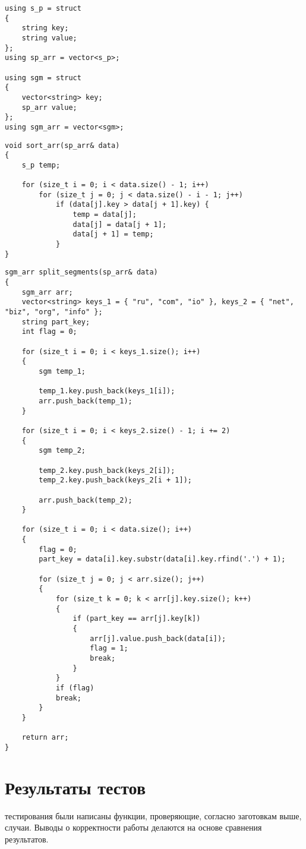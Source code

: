 \begin{lstlisting}[label=code4, caption = Используемые типы]
using s_p = struct
{
	string key;
	string value;
};
using sp_arr = vector<s_p>;

using sgm = struct
{
	vector<string> key;
	sp_arr value;
};
using sgm_arr = vector<sgm>;
\end{lstlisting}

\begin{lstlisting}[label=code5, caption = Функция сортировки словаря]
void sort_arr(sp_arr& data)
{
	s_p temp;
	
	for (size_t i = 0; i < data.size() - 1; i++)
		for (size_t j = 0; j < data.size() - i - 1; j++)
			if (data[j].key > data[j + 1].key) {
				temp = data[j];
				data[j] = data[j + 1];
				data[j + 1] = temp;
			}
}
\end{lstlisting}

\begin{lstlisting}[label=code6, caption = Функция разделения словаря по сегментам]
sgm_arr split_segments(sp_arr& data)
{
	sgm_arr arr;
	vector<string> keys_1 = { "ru", "com", "io" }, keys_2 = { "net", "biz", "org", "info" };
	string part_key;
	int flag = 0;
	
	for (size_t i = 0; i < keys_1.size(); i++)
	{
		sgm temp_1;
		
		temp_1.key.push_back(keys_1[i]);
		arr.push_back(temp_1);
	}
	
	for (size_t i = 0; i < keys_2.size() - 1; i += 2)
	{
		sgm temp_2;
		
		temp_2.key.push_back(keys_2[i]);
		temp_2.key.push_back(keys_2[i + 1]);
		
		arr.push_back(temp_2);
	}
	
	for (size_t i = 0; i < data.size(); i++)
	{
		flag = 0;
		part_key = data[i].key.substr(data[i].key.rfind('.') + 1);
		
		for (size_t j = 0; j < arr.size(); j++)
		{
			for (size_t k = 0; k < arr[j].key.size(); k++)
			{
				if (part_key == arr[j].key[k])
				{
					arr[j].value.push_back(data[i]);
					flag = 1;
					break;
				}
			}
			if (flag)
			break;
		}
	}
	
	return arr;
}
\end{lstlisting}

\section{Результаты тестов}
 тестирования были написаны функции, проверяющие, согласно заготовкам выше, случаи. Выводы о корректности работы делаются на основе сравнения результатов.\\

